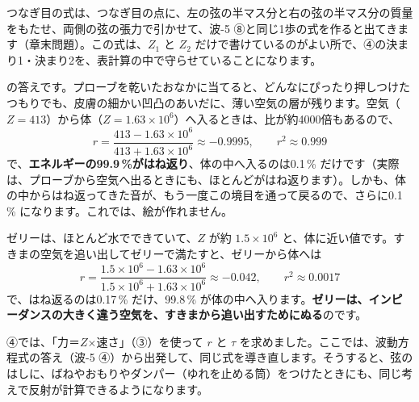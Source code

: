 \begin{seikaku}
つなぎ目の式は、つなぎ目の点に、左の弦の半マス分と右の弦の半マス分の質量をもたせ、両側の弦の張力で引かせて、波-5 ⑧と同じ1歩の式を作ると出てきます（章末問題）。この式は、$Z_1$ と $Z_2$ だけで書けているのがよい所で、④の決まり1・決まり2を、表計算の中で守らせていることになります。
\end{seikaku}

\label{ph:波-7:hatena}\bkhatenaref の答えです。プローブを乾いたおなかに当てると、どんなにぴったり押しつけたつもりでも、皮膚の細かい凹凸のあいだに、薄い空気の層が残ります。空気（$Z=413$）から体（$Z=1.63\times10^6$）へ入るときは、比が約4000倍もあるので、
\[r=\frac{413-1.63\times10^6}{413+1.63\times10^6}\approx-0.9995,\qquad r^2\approx0.999\]
で、\textbf{エネルギーの99.9\,\%がはね返り}、体の中へ入るのは0.1\,\% だけです（実際は、プローブから空気へ出るときにも、ほとんどがはね返ります）。しかも、体の中からはね返ってきた音が、もう一度この境目を通って戻るので、さらに0.1\,\% になります。これでは、絵が作れません。

ゼリーは、ほとんど水でできていて、$Z$ が約 $1.5\times10^6$ と、体に近い値です。すきまの空気を追い出してゼリーで満たすと、ゼリーから体へは
\[r=\frac{1.5\times10^6-1.63\times10^6}{1.5\times10^6+1.63\times10^6}\approx-0.042,\qquad r^2\approx0.0017\]
で、はね返るのは0.17\,\% だけ、99.8\,\% が体の中へ入ります。\textbf{ゼリーは、インピーダンスの大きく違う空気を、すきまから追い出すためにぬる}のです。

\begin{phmodel}
\end{phmodel}

\phkokomade


\label{ph:波-7:sec5}
④では、「力＝$Z$×速さ」（③）を使って $r$ と $\tau$ を求めました。ここでは、波動方程式の答え（波-5 ④）から出発して、同じ式を導き直します。そうすると、弦のはしに、ばねやおもりやダンパー（ゆれを止める筒）をつけたときにも、同じ考えで反射が計算できるようになります。

